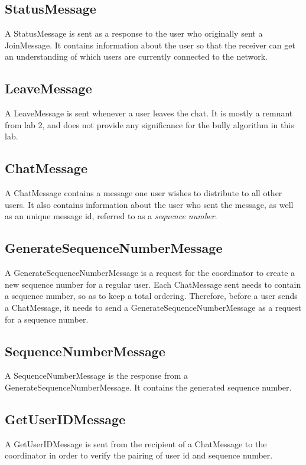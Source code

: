 \documentclass[a4paper, titlepage,12pt]{article}
\begin{document}
\subsection{StatusMessage}
	A StatusMessage is sent as a response to the user who originally sent a JoinMessage. It contains information about the user so that the receiver can get an understanding of which users are currently connected to the network.

\subsection{LeaveMessage}
	A LeaveMessage is sent whenever a user leaves the chat. It is mostly a remnant from lab 2, and does not provide any significance for the bully algorithm in this lab.

\subsection{ChatMessage}
	A ChatMessage contains a message one user wishes to distribute to all other users. It also contains information about the user who sent the message, as well as an unique message id, referred to as a \emph{sequence number}.

\subsection{GenerateSequenceNumberMessage}
	A GenerateSequenceNumberMessage is a request for the coordinator to create a new sequence number for a regular user. Each ChatMessage sent needs to contain a sequence number, so as to keep a total ordering. Therefore, before a user sends a ChatMessage, it needs to send a GenerateSequenceNumberMessage as a request for a sequence number.

\subsection{SequenceNumberMessage}
	A SequenceNumberMessage is the response from a GenerateSequenceNumberMessage. It contains the generated sequence number.

\subsection{GetUserIDMessage}
	A GetUserIDMessage is sent from the recipient of a ChatMessage to the coordinator in order to verify the pairing of user id and sequence number.
\end{document}
